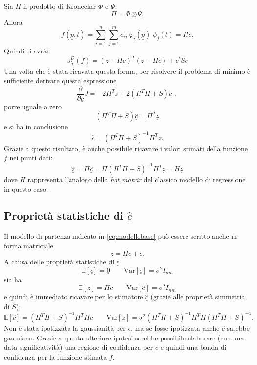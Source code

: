 \documentclass[a4paper,11pt,twoside,openright]{book}							%
\begin{document}
Sia $\Pi$ il prodotto di Kronecker $\Phi$ e $\Psi$:
$$ \Pi = \Phi \otimes \Psi .$$
Allora
$$
f(\underline p,t)=\sum_{i=1}^n \sum_{j=1}^m c_{ij}\ \varphi_i(\underline p)\ \psi_j(t) = \Pi \underline c .
$$
Quindi si avrà:
\begin{equation} 
\label{eq:Jmatr}
J_{\underline \lambda }^D(f) = (\underline z - \Pi \underline c)^T (\underline z - \Pi \underline c) + \underline c^t S \underline c 
\end{equation}
Una volta che è stata ricavata questa forma, per risolvere il problema di minimo è sufficiente derivare questa espressione
$$
\frac{\partial}{\partial \underline c}J= -2 \Pi^T \underline z + 2(\Pi^T \Pi + S) \underline c \ \ ,
$$
porre uguale a zero
$$
(\Pi^T \Pi + S) \hat{\underline c}=\Pi^T\underline z
$$
e si ha in conclusione
$$ \hat  {\underline c} = (\Pi^T \Pi + S)^{-1}\Pi^T \underline z .$$
Grazie a questo risultato, è anche possibile ricavare i valori stimati della funzione $f$ nei punti dati:
$$
\hat  {\underline z} =\Pi\hat  {\underline c} = \Pi(\Pi^T \Pi + S)^{-1}\Pi^T \underline z = H\underline{z}
$$
dove $H$ rappresenta l'analogo della \textit{hat matrix} del classico modello di regressione in questo caso.


\subsection*{Proprietà statistiche di $\hat  {\underline c}$}
Il modello di partenza indicato in \ref{eq:modellobase} può essere scritto anche in forma matriciale
\begin{equation}
\label{eq:modellobasematric}
\underline z=\Pi \underline c + \underline \epsilon .
\end{equation}
A causa delle proprietà statistiche di $\underline \epsilon$
$$
\mathbb{E}[\underline \epsilon] = \underline 0 \qquad \mathrm{Var}[\underline \epsilon] = \sigma^2 I_{nm}
$$
sia ha
$$
\mathbb{E}[\underline z] = \Pi \underline c \qquad \mathrm{Var}[\hat  {\underline c}] = \sigma^2 I_{nm}
$$
e quindi è immediato ricavare per lo stimatore $\hat  {\underline c}$ (grazie alle proprietà simmetria di $S$):
$$
\mathbb{E}[\hat  {\underline c}] = (\Pi^T \Pi + S)^{-1}\Pi^T\Pi \underline c \qquad \mathrm{Var}[\underline z] = \sigma^2 (\Pi^T \Pi + S)^{-1}\Pi^T\Pi(\Pi^T \Pi + S)^{-1} .
$$
Non è stata ipotizzata la gaussianità per $\underline \epsilon$, ma se fosse ipotizzata anche $\hat  {\underline c}$ sarebbe gaussiano. Grazie a questa ulteriore ipotesi sarebbe possibile elaborare (con una data significatività) una regione di confidenza per $\hat  {\underline c}$ e quindi una banda di confidenza per la funzione stimata $f$.
\end{document}
